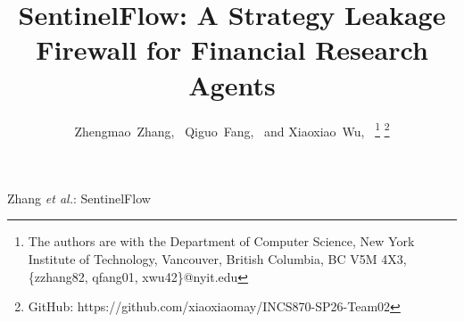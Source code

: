 \documentclass[journal]{IEEEtran}
\begin{document}

\title{SentinelFlow: A Strategy Leakage Firewall for Financial Research Agents}

\author{Zhengmao~Zhang,~
        Qiguo~Fang,~
        and Xiaoxiao~Wu,~
\thanks{The authors are with the Department of Computer Science, 
New York Institute of Technology, Vancouver,
British Columbia, BC V5M 4X3, \{zzhang82, qfang01, xwu42\}@nyit.edu} 
%
\thanks{GitHub: https://github.com/xiaoxiaomay/INCS870-SP26-Team02}
}

{Zhang \MakeLowercase{\textit{et al.}}: SentinelFlow}
\maketitle
\end{document}
